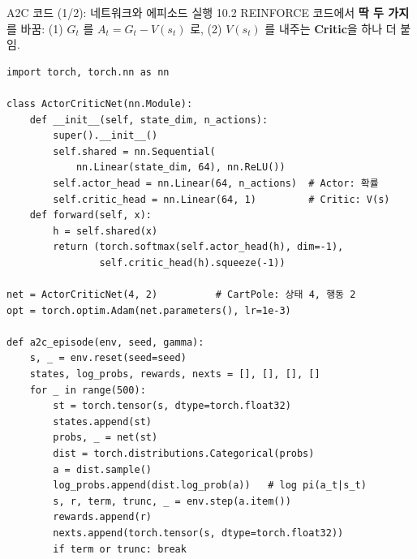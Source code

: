 \begin{frame}[fragile]{A2C 코드 (1/2): 네트워크와 에피소드 실행}
  10.2 REINFORCE 코드에서 \textbf{딱 두 가지}를 바꿈:
  (1) $G_t$ 를 $A_t = G_t - V(s_t)$ 로,
  (2) $V(s_t)$ 를 내주는 \textbf{Critic}을 하나 더 붙임.
\begin{lstlisting}
import torch, torch.nn as nn

class ActorCriticNet(nn.Module):
    def __init__(self, state_dim, n_actions):
        super().__init__()
        self.shared = nn.Sequential(
            nn.Linear(state_dim, 64), nn.ReLU())
        self.actor_head = nn.Linear(64, n_actions)  # Actor: 확률
        self.critic_head = nn.Linear(64, 1)         # Critic: V(s)
    def forward(self, x):
        h = self.shared(x)
        return (torch.softmax(self.actor_head(h), dim=-1),
                self.critic_head(h).squeeze(-1))

net = ActorCriticNet(4, 2)          # CartPole: 상태 4, 행동 2
opt = torch.optim.Adam(net.parameters(), lr=1e-3)

def a2c_episode(env, seed, gamma):
    s, _ = env.reset(seed=seed)
    states, log_probs, rewards, nexts = [], [], [], []
    for _ in range(500):
        st = torch.tensor(s, dtype=torch.float32)
        states.append(st)
        probs, _ = net(st)
        dist = torch.distributions.Categorical(probs)
        a = dist.sample()
        log_probs.append(dist.log_prob(a))   # log pi(a_t|s_t)
        s, r, term, trunc, _ = env.step(a.item())
        rewards.append(r)
        nexts.append(torch.tensor(s, dtype=torch.float32))
        if term or trunc: break
\end{lstlisting}
\end{frame}
